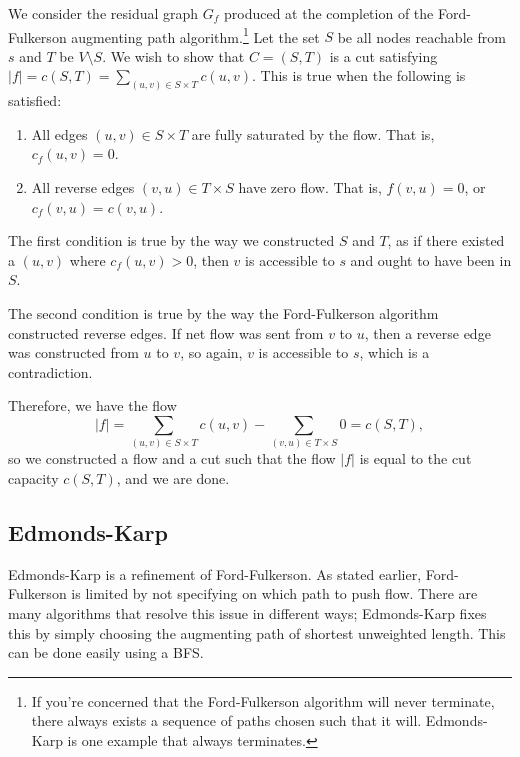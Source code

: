 We consider the residual graph $G_f$ produced at the completion of the Ford-Fulkerson augmenting path algorithm.\footnote{If you're concerned that the Ford-Fulkerson algorithm will never terminate, there always exists a sequence of paths chosen such that it will. Edmonds-Karp is one example that always terminates.} Let the set $S$ be all nodes reachable from $s$ and $T$ be $V \setminus S$. We wish to show that $C=(S,T)$ is a cut satisfying $|f|=c(S,T)=\sum_{(u,v) \in S \times T} c(u,v)$. This is true when the following is satisfied:

\begin{enumerate}

\item
All edges $(u,v) \in S \times T$ are fully saturated by the flow. That is, $c_f(u,v) = 0$.

\item
All reverse edges $(v, u) \in T \times S$ have zero flow. That is, $f(v,u) = 0$, or $c_f(v,u) = c(v,u)$.

\end{enumerate}

The first condition is true by the way we constructed $S$ and $T$, as if there existed a $(u,v)$ where $c_f(u,v) > 0$, then $v$ is accessible to $s$ and ought to have been in $S$.

The second condition is true by the way the Ford-Fulkerson algorithm constructed reverse edges. If net flow was sent from $v$ to $u$, then a reverse edge was constructed from $u$ to $v$, so again, $v$ is accessible to $s$, which is a contradiction.

Therefore, we have the flow
\[|f|=\sum_{(u,v) \in S \times T} c(u,v) - \sum_{(v,u) \in T \times S} 0 = c(S,T),\]
so we constructed a flow and a cut such that the flow $|f|$ is equal to the cut capacity $c(S,T)$, and we are done.

\subsection{Edmonds-Karp}

Edmonds-Karp is a refinement of Ford-Fulkerson. As stated earlier, Ford-Fulkerson is limited by not specifying on which path to push flow. There are many algorithms that resolve this issue in different ways; Edmonds-Karp fixes this by simply choosing the augmenting path of shortest unweighted length. This can be done easily using a BFS.

